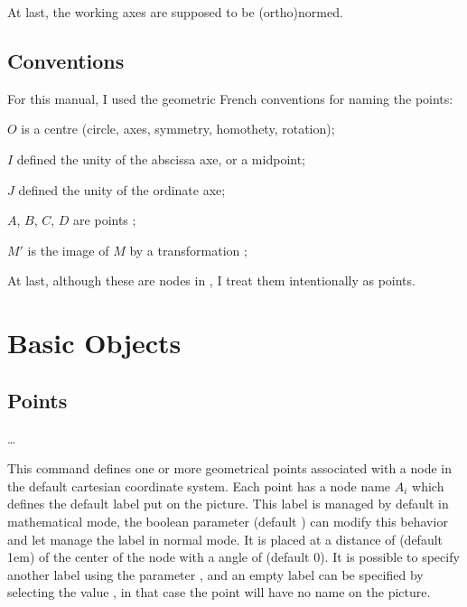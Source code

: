 \documentclass[11pt,english,BCOR=10mm,DIV=12,bibliography=totoc,parskip=false,headings=small,
    headinclude=false,footinclude=false,twoside,english]{pst-doc}
\begin{document}
At last, the working axes are supposed to be (ortho)normed.

\subsection{Conventions}

For this manual, I used the geometric French conventions for naming
the points:

\begin{compactitem}
\item $O$ is a centre (circle, axes, symmetry, homothety, rotation);
\item $I$ defined the unity of the abscissa axe, or a midpoint;
\item $J$ defined the unity of the ordinate axe;
\item $A$, $B$, $C$, $D$ are points ;
\item $M'$ is the image of $M$ by a transformation ;
\end{compactitem}

At last, although these are nodes in \PST, I treat them
intentionally as points.

\section{Basic Objects}
\subsection{Points}

\begin{BDef}
\OptArgs{}\ldots\cAny{}
\end{BDef}
This command defines one or more geometrical points associated with a node in the default cartesian coordinate system. Each
point has a node name $A_i$ which defines the default label put on the
picture. This label is managed by default in mathematical mode, the boolean parameter
 (default \true) can modify this behavior and let manage the
label in normal mode.  It is placed at a distance of 
(default 1em) of the center of the node with a angle of
 (default 0). It is possible to specify another label using the
parameter , and an empty label can be specified
by selecting the value , in that case the point will have no name on the
picture.
\end{document}
